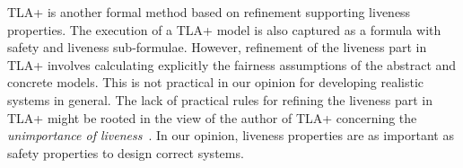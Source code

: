 %
%
%
TLA+\cite{DBLP_books_aw_Lamport2002} is another formal method based on
refinement supporting liveness properties.  The
execution of a TLA+ model is also captured as a formula with safety
and liveness sub-formulae.  However, refinement of the liveness part
in TLA+ involves calculating explicitly the fairness assumptions of the
abstract and concrete models.  This is not practical in our
opinion for developing realistic systems in general.  The
lack of practical rules for refining the liveness part in TLA+ might be
rooted in the view of the author of TLA+ concerning the
\emph{unimportance of liveness}~\cite[Chapter
8]{DBLP_books_aw_Lamport2002}.  In our opinion, liveness
properties are as important as safety properties to design
correct systems.

